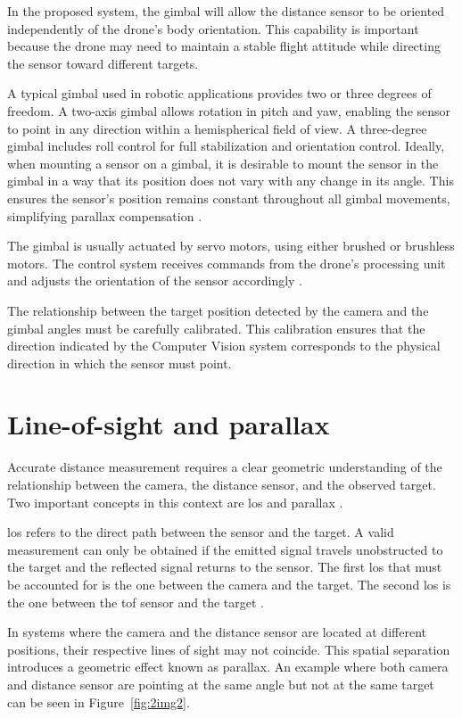 In the proposed system, the gimbal will allow the distance sensor to be oriented
independently
of the drone's body orientation. This capability is important because the drone may need to
maintain a stable flight attitude while directing the sensor toward different targets.

A typical gimbal used in robotic applications provides two or three degrees of freedom. A
two-axis gimbal allows rotation in pitch and yaw, enabling the sensor to point in any
direction within a hemispherical field of view. A three-degree gimbal includes roll control
for full stabilization and orientation control. Ideally, when mounting a sensor on a gimbal,
it is desirable to mount the sensor in the gimbal in a way that its position does not vary
with any change in its angle. This ensures the sensor's position remains constant throughout
all gimbal movements, simplifying parallax compensation \cite{robotics2}.

The gimbal is usually actuated by servo motors, using either brushed or brushless motors.
The control system receives commands from the drone's processing unit and adjusts the
orientation of the sensor accordingly \cite{servos}.

The relationship between the target position detected by the camera and the gimbal angles
must be carefully calibrated. This calibration ensures that the direction indicated by
the Computer Vision system corresponds to the physical direction in which the sensor must
point.

\section{Line-of-sight and parallax}

Accurate distance measurement requires a clear geometric understanding of the relationship
between the camera, the distance sensor, and the observed target. Two important concepts
in this context are \gls{los} and parallax \cite{parallax4}.

\gls{los} refers to the direct path between the sensor and the target. A valid
measurement can only be obtained if the emitted signal travels unobstructed to the target
and the reflected signal returns to the sensor. The first \gls{los} that must be accounted
for is the one between the camera and the target. The second \gls{los} is the one between
the \gls{tof} sensor and the target \cite{parallax1}.

In systems where the camera and the distance sensor are located at different positions,
their respective lines of sight may not coincide. This spatial separation introduces a
geometric effect known as parallax. An example where both camera and distance sensor are
pointing at the same angle but not at the same target can be seen in Figure~\ref{fig:2img2}.

